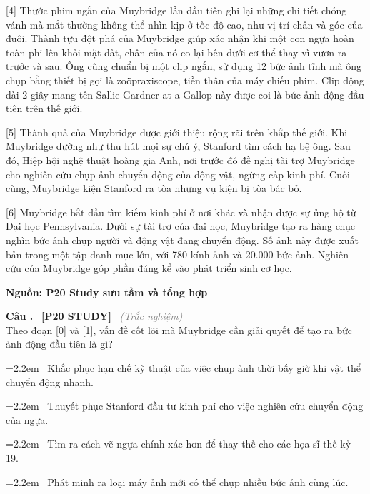 \documentclass[12pt,a4paper,twoside]{article}
\newcounter{qcounter}
\newcommand{\question}[2][]{%
    \stepcounter{qcounter}%
    \par\vspace{5pt}%
    \noindent\textcolor{primaryBlue}{\textbf{Câu \theqcounter.}}~%
    \textcolor{secondaryBlue}{\small\textbf{[P20 STUDY]}}~%
    \if\relax\detokenize{#1}\relax\else\textcolor{gray}{\small\textit{(#1)}}~\fi\\[1pt]
    \noindent #2%
}
\newcommand{\choiceitem}[2]{%
    \tikz[baseline=-0.5ex]{
        \node[draw=primaryBlue, circle, minimum size=1.5em, inner sep=0pt, thick] {\textbf{#1}};
    }~#2%
}
\newenvironment{readingpassage}[1][]{%
    \begin{tcolorbox}[enhanced, colback=grayLight, colframe=secondaryBlue,
        coltitle=textDark, fonttitle=\bfseries, title={#1},
        rounded corners, arc=3mm, boxrule=1pt,
        left=15pt, right=15pt, top=10pt, bottom=10pt,
        breakable, before skip=10pt, after skip=10pt, drop fuzzy shadow]
    \setstretch{1.3}
}{\end{tcolorbox}}
\begin{document}
\begin{readingpassage}[]
[4] Thước phim ngắn của Muybridge lần đầu tiên ghi lại những chi tiết chóng vánh mà mắt thường không thể nhìn kịp ở tốc độ cao, như vị trí chân và góc của đuôi. Thành tựu đột phá của Muybridge giúp xác nhận khi một con ngựa hoàn toàn phi lên khỏi mặt đất, chân của nó co lại bên dưới cơ thể thay vì vươn ra trước và sau. Ông cũng chuẩn bị một clip ngắn, sử dụng 12 bức ảnh tĩnh mà ông chụp bằng thiết bị gọi là zoöpraxiscope, tiền thân của máy chiếu phim. Clip động dài 2 giây mang tên Sallie Gardner at a Gallop này được coi là bức ảnh động đầu tiên trên thế giới.

[5] Thành quả của Muybridge được giới thiệu rộng rãi trên khắp thế giới. Khi Muybridge dường như thu hút mọi sự chú ý, Stanford tìm cách hạ bệ ông. Sau đó, Hiệp hội nghệ thuật hoàng gia Anh, nơi trước đó đề nghị tài trợ Muybridge cho nghiên cứu chụp ảnh chuyển động của động vật, ngừng cấp kinh phí. Cuối cùng, Muybridge kiện Stanford ra tòa nhưng vụ kiện bị tòa bác bỏ.

[6] Muybridge bắt đầu tìm kiếm kinh phí ở nơi khác và nhận được sự ủng hộ từ Đại học Pennsylvania. Dưới sự tài trợ của đại học, Muybridge tạo ra hàng chục nghìn bức ảnh chụp người và động vật đang chuyển động. Số ảnh này được xuất bản trong một tập danh mục lớn, với 780 kính ảnh và 20.000 bức ảnh. Nghiên cứu của Muybridge góp phần đáng kể vào phát triển sinh cơ học.

\hfill \textbf{Nguồn: P20 Study sưu tầm và tổng hợp}
\end{readingpassage}

\setcounter{qcounter}{0}
\question[Trắc nghiệm]{Theo đoạn [0] và [1], vấn đề cốt lõi mà Muybridge cần giải quyết để tạo ra bức ảnh động đầu tiên là gì?}
\par\vspace{4pt}
\noindent\hangindent=2.2em\choiceitem{A}{Khắc phục hạn chế kỹ thuật của việc chụp ảnh thời bấy giờ khi vật thể chuyển động nhanh.}\par\vspace{4pt}
\noindent\hangindent=2.2em\choiceitem{B}{Thuyết phục Stanford đầu tư kinh phí cho việc nghiên cứu chuyển động của ngựa.}\par\vspace{4pt}
\noindent\hangindent=2.2em\choiceitem{C}{Tìm ra cách vẽ ngựa chính xác hơn để thay thế cho các họa sĩ thế kỷ 19.}\par\vspace{4pt}
\noindent\hangindent=2.2em\choiceitem{D}{Phát minh ra loại máy ảnh mới có thể chụp nhiều bức ảnh cùng lúc.}\par\vspace{4pt}
\end{document}

